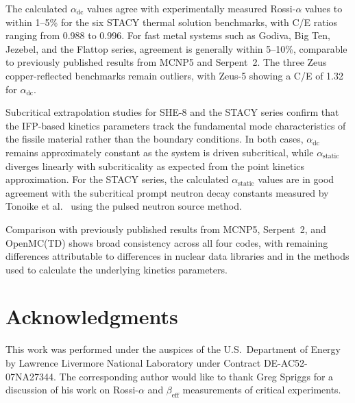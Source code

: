 \documentclass[12pt,preprint]{elsarticle}
\begin{document}
The calculated $\alpha_{\mathrm{dc}}$ values agree with experimentally measured Rossi-$\alpha$ values to within 1--5\% for the six STACY thermal solution benchmarks, with C/E ratios ranging from 0.988 to 0.996. For fast metal systems such as Godiva, Big Ten, Jezebel, and the Flattop series, agreement is generally within 5--10\%, comparable to previously published results from MCNP5 and Serpent~2. The three Zeus copper-reflected benchmarks remain outliers, with Zeus-5 showing a C/E of 1.32 for $\alpha_{\mathrm{dc}}$.

Subcritical extrapolation studies for SHE-8 and the STACY series confirm that the IFP-based kinetics parameters track the fundamental mode characteristics of the fissile material rather than the boundary conditions. In both cases, $\alpha_{\mathrm{dc}}$ remains approximately constant as the system is driven subcritical, while $\alpha_{\mathrm{static}}$ diverges linearly with subcriticality as expected from the point kinetics approximation. For the STACY series, the calculated $\alpha_{\mathrm{static}}$ values are in good agreement with the subcritical prompt neutron decay constants measured by Tonoike et al.~\cite{tonoike2002} using the pulsed neutron source method.

Comparison with previously published results from MCNP5, Serpent~2, and OpenMC(TD) shows broad consistency across all four codes, with remaining differences attributable to differences in nuclear data libraries and in the methods used to calculate the underlying kinetics parameters.

\section*{Acknowledgments}

This work was performed under the auspices of the U.S.\ Department of Energy by Lawrence Livermore National Laboratory under Contract DE-AC52-07NA27344. The corresponding author would like to thank Greg Spriggs for a discussion of his work on Rossi-$\alpha$ and $\beta_{\mathrm{eff}}$ measurements of critical experiments.
\end{document}
